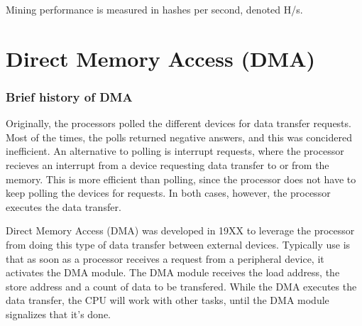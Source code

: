 Mining performance is measured in hashes per second, denoted H/s.


%
%

\section{Direct Memory Access (DMA)}

\subsubsection{Brief history of DMA}

Originally, the processors polled the different devices for data transfer requests. Most of the times, the polls returned negative answers, and this was concidered inefficient. An alternative to polling is interrupt requests, where the processor recieves an interrupt from a device requesting data transfer to or from the memory. This is more efficient than polling, since the processor does not have to keep polling the devices for requests. In both cases, however, the processor executes the data transfer.

Direct Memory Access (DMA) was developed in 19XX to leverage the processor from doing this type of data transfer between external devices. Typically use is that as soon as a processor receives a request from a peripheral device, it activates the DMA module. The DMA module receives the load address, the store address and a count of data to be transfered. While the DMA executes the data transfer, the CPU will work with other tasks, until the DMA module signalizes that it's done.

